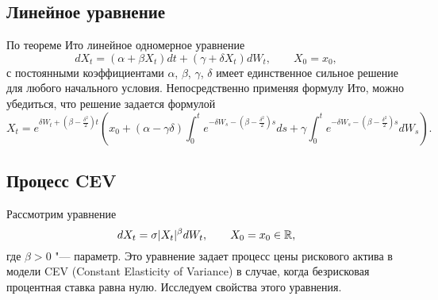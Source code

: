 \subsection{Линейное уравнение}

По теореме Ито линейное одномерное уравнение 
\[
dX_t = (\alpha + \beta X_t)dt + (\gamma + \delta X_t) d W_t, \qquad X_0=x_0,
\]
с постоянными коэффициентами %
$\alpha$, $\beta$, $\gamma$, $\delta$ имеет единственное сильное решение для любого начального условия.
Непосредственно применяя формулу Ито, можно убедиться, что решение задается формулой
\[
X_t = e^{\delta W_t + (\beta-\frac{\delta^2}{2})t}
\left(x_0 + (\alpha - \gamma\delta) \int_0^t e^{-\delta W_s - (\beta-\frac{\delta^2}{2})s} ds
+ \gamma \int_0^t e^{-\delta W_s - (\beta-\frac{\delta^2}{2})s} dW_s\right).
\]


\subsection{Процесс CEV}

Рассмотрим уравнение
\begin{equation}
\label{sde:cev}
d X_t = \sigma |X_t|^\beta d W_t, \qquad X_0=x_0\in \mathbb{R},
\end{equation}
где $\beta>0$ "--- параметр.
Это уравнение задает процесс цены рискового актива в модели CEV (Constant Elasticity of Variance) в случае, когда безрисковая процентная ставка равна нулю.
Исследуем свойства этого уравнения.

